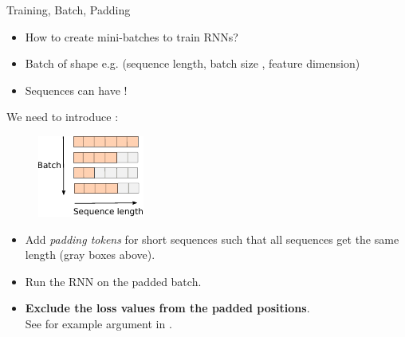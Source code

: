 \begin{frame}[fragile]{Training, Batch, Padding}
\vspace{-5mm}
\begin{itemize}
\item How to create mini-batches to train RNNs?
\item Batch of shape e.g. (sequence length, batch size , feature dimension)
\item Sequences can have !
\end{itemize}
\vsp
We need to introduce :
\begin{figure}
                        \centering
                        \includegraphics[width=.3\linewidth]{./figures/padding.pdf}
\end{figure}

\begin{itemize}
\item Add \textit{padding tokens} for short sequences such that all sequences get the same length (gray boxes above).
\item Run the RNN on the padded batch.
\item \textbf{Exclude the loss values from the padded positions}.\\
See for example  argument in .
\end{itemize}
\end{frame}

